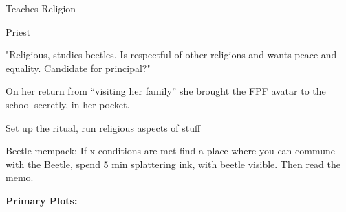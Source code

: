 \documentclass[char]{GL2020}
\begin{document}
\name{\cBeetle{}}








Teaches Religion

Priest

"Religious, studies beetles.  Is respectful of other religions and wants peace and equality.
Candidate for principal?"

On her return from "`visiting her family"' she brought the FPF avatar to the school secretly, in her pocket.

Set up the ritual, run religious aspects of stuff

Beetle mempack:  If x conditions are met find a place where you can commune with the Beetle, spend 5 min splattering ink, with beetle visible.  Then read the memo.

\textbf{Primary Plots:}
\end{document}

